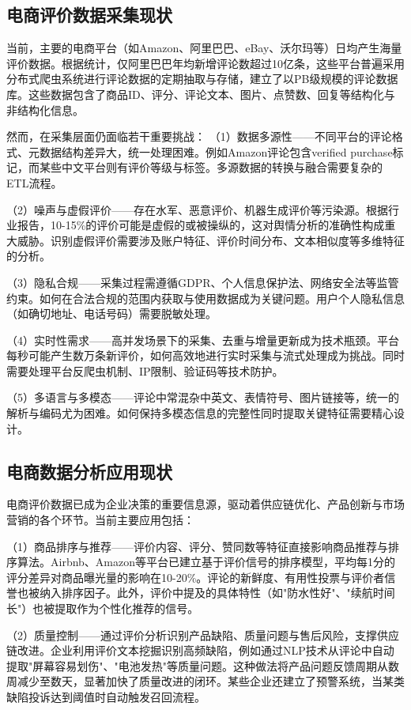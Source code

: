 \subsection{电商评价数据采集现状}

当前，主要的电商平台（如Amazon、阿里巴巴、eBay、沃尔玛等）日均产生海量评价数据。根据统计，仅阿里巴巴年均新增评论数超过10亿条，这些平台普遍采用分布式爬虫系统进行评论数据的定期抽取与存储，建立了以PB级规模的评论数据库。这些数据包含了商品ID、评分、评论文本、图片、点赞数、回复等结构化与非结构化信息。

然而，在采集层面仍面临若干重要挑战：
（1）数据多源性——不同平台的评论格式、元数据结构差异大，统一处理困难。例如Amazon评论包含verified purchase标记，而某些中文平台则有评价等级与标签。多源数据的转换与融合需要复杂的ETL流程。

（2）噪声与虚假评价——存在水军、恶意评价、机器生成评价等污染源。根据行业报告，10-15\%的评价可能是虚假的或被操纵的，这对舆情分析的准确性构成重大威胁。识别虚假评价需要涉及账户特征、评价时间分布、文本相似度等多维特征的分析。

（3）隐私合规——采集过程需遵循GDPR、个人信息保护法、网络安全法等监管约束。如何在合法合规的范围内获取与使用数据成为关键问题。用户个人隐私信息（如确切地址、电话号码）需要脱敏处理。

（4）实时性需求——高并发场景下的采集、去重与增量更新成为技术瓶颈。平台每秒可能产生数万条新评价，如何高效地进行实时采集与流式处理成为挑战。同时需要处理平台反爬虫机制、IP限制、验证码等技术防护。

（5）多语言与多模态——评论中常混杂中英文、表情符号、图片链接等，统一的解析与编码尤为困难。如何保持多模态信息的完整性同时提取关键特征需要精心设计。

\subsection{电商数据分析应用现状}

电商评价数据已成为企业决策的重要信息源，驱动着供应链优化、产品创新与市场营销的各个环节。当前主要应用包括：

（1）商品排序与推荐——评价内容、评分、赞同数等特征直接影响商品推荐与排序算法。Airbnb、Amazon等平台已建立基于评价信号的排序模型，平均每1分的评分差异对商品曝光量的影响在10-20\%。评论的新鲜度、有用性投票与评价者信誉也被纳入排序因子。此外，评价中提及的具体特性（如"防水性好"、"续航时间长"）也被提取作为个性化推荐的信号。

（2）质量控制——通过评价分析识别产品缺陷、质量问题与售后风险，支撑供应链改进。企业利用评价文本挖掘识别高频缺陷，例如通过NLP技术从评论中自动提取"屏幕容易划伤"、"电池发热"等质量问题。这种做法将产品问题反馈周期从数周减少至数天，显著加快了质量改进的闭环。某些企业还建立了预警系统，当某类缺陷投诉达到阈值时自动触发召回流程。

